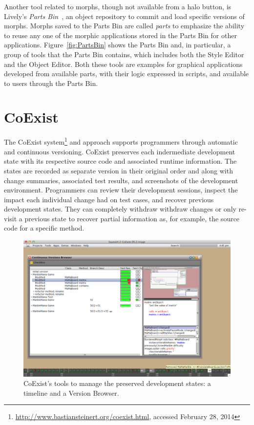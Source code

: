 Another tool related to morphs, though not available from a halo button, is Lively's \emph{Parts Bin}~\cite{Lincke2012LPC}, an object repository to commit and load specific versions of morphs.
Morphs saved to the Parts Bin are called \emph{parts} to emphasize the ability to reuse any one of the morphic applications stored in the Parts Bin for other applications.
Figure~\ref{fig:PartsBin} shows the Parts Bin and, in particular, a group of tools that the Parts Bin contains, which includes both the Style Editor and the Object Editor.
Both these tools are examples for graphical applications developed from available parts, with their logic expressed in scripts, and available to users through the Parts Bin.


\section{CoExist}

The CoExist system\footnote{\url{http://www.bastiansteinert.org/coexist.html}, accessed February 28, 2014} and approach supports programmers through automatic and continuous versioning.
CoExist preserves each indermediate development state with its respective source code and associated runtime information.
The states are recorded as separate version in their original order and along with change summaries, associated test results, and screenshots of the development environment.
Programmers can review their development sessions, inspect the impact each individual change had on test cases, and recover previous development states.
They can completely withdraw withdraw changes or only re-visit a previous state to recover partial information as, for example, the source code for a specific method.

\begin{figure}[h]
    \centering
    \includegraphics[width=\textwidth]{figures/coexistTools.pdf}
    \caption{CoExist's tools to manage the preserved development states: a timeline and a Version Browser.}
    \label{fig:CoExist}
\end{figure}

